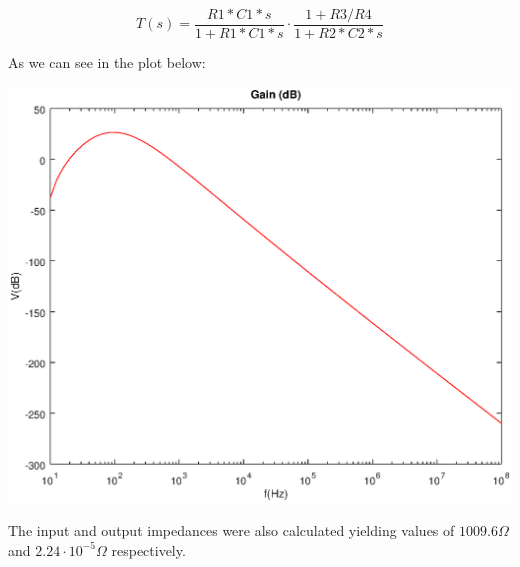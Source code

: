 \begin{equation}
    T(s)=\frac{R1*C1*s}{1+R1*C1*s}\cdot \frac{1+R3/R4}{1+R2*C2*s}
\end{equation}

As we can see in the plot below:

\includegraphics[width=0.8\linewidth]{teodB.eps}

The input and output impedances were also calculated yielding values of $1009.6 \Omega$ and $2.24\cdot 10^{-5} \Omega$ respectively.